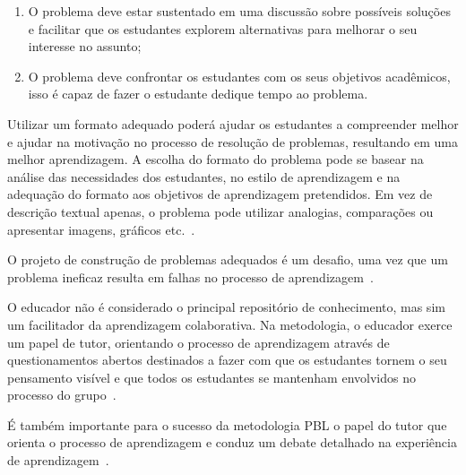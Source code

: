 \begin{enumerate}
{explicitamente e nem referências para uma solução,
para não prejudicar os estudantes na
autoaprendizagem;}
\item{O problema deve estar sustentado em uma discussão
sobre possíveis soluções e facilitar que os estudantes
explorem alternativas para melhorar o seu interesse
no assunto;}
\item{O problema deve confrontar os estudantes com
os seus objetivos acadêmicos, isso é capaz de
fazer o estudante dedique tempo ao problema.}
\end{enumerate}

Utilizar um formato adequado poderá ajudar os estudantes
a compreender melhor e ajudar na motivação no processo
de resolução de problemas, resultando em uma
melhor aprendizagem.
A escolha do formato do problema pode se basear na análise
das necessidades dos estudantes, no estilo de aprendizagem
e na adequação do formato aos objetivos de
aprendizagem pretendidos.
Em vez de descrição textual apenas, o problema pode
utilizar analogias, comparações ou apresentar imagens,
gráficos etc.~\cite{sockalingam2011student}.

O projeto de construção de problemas adequados é um desafio, uma
vez que um problema ineficaz resulta em falhas no processo de
aprendizagem~\cite{azer2012twelve,amos1998problem,
des1999delphi,kukkamalla2011designing}.


O educador não é considerado o principal repositório
de conhecimento, mas sim um facilitador da aprendizagem
colaborativa.
Na metodologia, o educador exerce um papel de tutor, orientando
o processo de aprendizagem através de questionamentos abertos
destinados a fazer com que os estudantes tornem o seu pensamento
visível e que todos os estudantes se mantenham envolvidos
no processo do grupo~\cite{hmelo2004problem}.

É também importante para o sucesso da metodologia \ac{PBL} o
papel do tutor que orienta o processo de aprendizagem
e conduz um debate detalhado na experiência de
aprendizagem~\cite{savery2015overview}.

